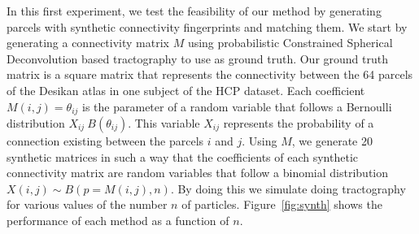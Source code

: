 In this first experiment, we test the feasibility of our method by generating parcels with synthetic connectivity fingerprints and matching them. We start by generating a connectivity matrix $M$ using probabilistic Constrained Spherical Deconvolution based tractography to use as ground truth. Our ground truth matrix is a square matrix that represents the connectivity between the 64 parcels of the Desikan atlas in one subject of the HCP dataset. Each coefficient $M(i,j) = \theta_{ij}$ is the parameter of a random variable that follows a Bernoulli distribution $X_{ij} ~ B(\theta_{ij})$. This variable $X_{ij}$ represents the probability of a connection existing between the parcels $i$ and $j$. 
Using $M$, we generate 20 synthetic matrices in such a way that the coefficients of each synthetic connectivity matrix are random variables that follow a binomial distribution $X(i,j) \sim B(p=M(i,j),n)$. 
By doing this we simulate doing tractography for various values of the number $n$ of particles. Figure~\ref{fig:synth} shows the performance of each method as a function of $n$.  





